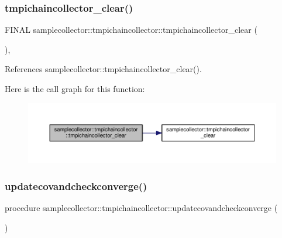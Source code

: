 \subsubsection{\texorpdfstring{tmpichaincollector\+\_\+clear()}{tmpichaincollector\_clear()}}
{\footnotesize\ttfamily F\+I\+N\+AL samplecollector\+::tmpichaincollector\+::tmpichaincollector\+\_\+clear (\begin{DoxyParamCaption}{ }\end{DoxyParamCaption})\hspace{0.3cm}{\ttfamily [final]}, {\ttfamily [private]}}



References samplecollector\+::tmpichaincollector\+\_\+clear().

Here is the call graph for this function\+:
\nopagebreak
\begin{figure}[H]
\begin{center}
\leavevmode
\includegraphics[width=350pt]{structsamplecollector_1_1tmpichaincollector_a12f83ab5d21b831dfdc5f8e1bff3ec85_cgraph}
\end{center}
\end{figure}
\mbox{\label{structsamplecollector_1_1tmpichaincollector_ac62f9cbd3d3d3d1749db875d7090dd95}} 
\subsubsection{\texorpdfstring{updatecovandcheckconverge()}{updatecovandcheckconverge()}}
{\footnotesize\ttfamily procedure samplecollector\+::tmpichaincollector\+::updatecovandcheckconverge (\begin{DoxyParamCaption}{ }\end{DoxyParamCaption})\hspace{0.3cm}{\ttfamily [private]}}

\mbox{\label{structsamplecollector_1_1tmpichaincollector_a41ccea8027bb976be2ef4e2d3d186bf2}} 
